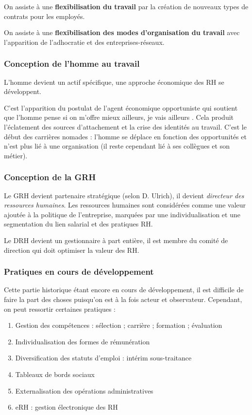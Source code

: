 \documentclass[12pt]{article}
\begin{document}
		On assiste à une \textbf{flexibilisation du travail} par la création de nouveaux types de contrats pour les employés.
		
		On assiste à une \textbf{flexibilisation des modes d'organisation du travail} avec l'apparition de l'adhocratie et des entreprises-réseaux.
		
		\subsubsection{Conception de l’homme au travail}
		
		L'homme devient un actif spécifique, une approche économique des RH se développent.
		
		C'est l'apparition du postulat de \og{} l'agent économique opportuniste \fg{} qui soutient que l'homme pense \og{} si on m'offre mieux ailleurs, je vais ailleurs \fg{}. Cela produit l'éclatement des sources d'attachement et la crise des identités au travail. C'est le début des carrières nomades : l'homme se déplace en fonction des opportunités et n'est plus lié à une organisation (il reste cependant lié à ses collègues et son métier).
		
		\subsubsection{Conception de la GRH}
		
		Le GRH devient \og{} partenaire stratégique \fg{} (selon D. Ulrich), il devient \emph{directeur des ressources humaines}. Les ressources humaines sont considérées comme une valeur ajoutée à la politique de l'entreprise, marquées par une individualisation et une segmentation du lien salarial et des pratiques RH.
		
		Le DRH devient un gestionnaire à part entière, il est membre du comité de direction qui doit optimiser la valeur des RH.
		
		\subsubsection{Pratiques en cours de développement}
		
		Cette partie historique étant encore en cours de développement, il est difficile de faire la part des choses puisqu'on est à la fois acteur et observateur. Cependant, on peut ressortir certaines pratiques :
		
		\begin{enumerate}
		 \item Gestion des compétences :
		    \subitem sélection ;
		    \subitem carrière ;
		    \subitem formation ;
		    \subitem évaluation
		 \item Individualisation des formes de rémunération
		 \item Diversification des statuts d'emploi :
		    \subitem intérim
		    \subitem sous-traitance
		 \item Tableaux de bords sociaux
		 \item Externalisation des opérations administratives
		 \item eRH : gestion électronique des RH
		\end{enumerate}
\end{document}
